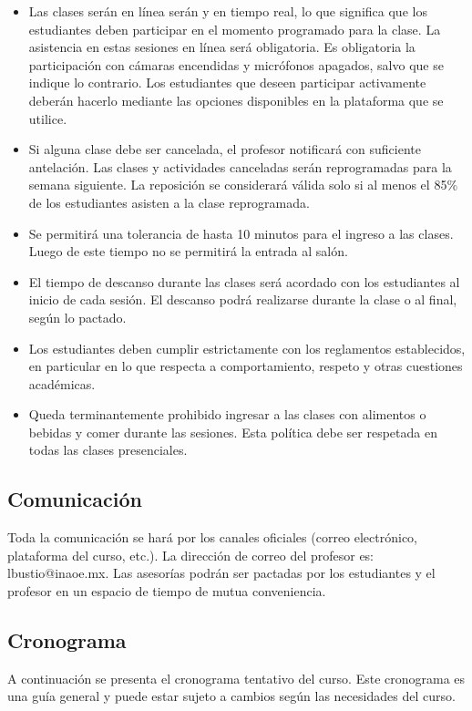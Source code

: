 \documentclass[
  coursetitle={Cómputo Nube y Tecnologías Emergentes},
  coursehours={96},
  coursedate={Verano 2026},
  doctype={Guía del curso},
  otherlangs={english,french},
  authorname={Lázaro},
  authorsurname={Bustio-Martínez},
  authortitle={PhD},
  role={Profesor Investigador},
  email={lbustio@inaoe.mx},
  phone={5559504000},
  ext={7459},
  institution={Instituto Nacional de Astrofísica, Óptica y Electrónica (INAOE)},
  department={Maestría en Ciencias en Tecnologías de Seguridad},
  address={Luis Enrique Erro 1, Sta. Ma. Tonantzintla, San Andrés Cholula, CP 72840, Puebla, México},
  margin={0.5in}
]{lbustio_lecture_notes}
\begin{document}
\begin{itemize}
  \item Las clases serán en línea serán y en tiempo real, lo que significa que los estudiantes deben participar en el momento programado para la clase. La asistencia en estas sesiones en línea será obligatoria. Es obligatoria la participación con cámaras encendidas y micrófonos apagados, salvo que se indique lo contrario. Los estudiantes que deseen participar activamente deberán hacerlo mediante las opciones disponibles en la plataforma que se utilice.
  \item Si alguna clase debe ser cancelada, el profesor notificará con suficiente antelación. Las clases y actividades canceladas serán reprogramadas para la semana siguiente. La reposición se considerará válida solo si al menos el 85\% de los estudiantes asisten a la clase reprogramada.
  \item Se permitirá una tolerancia de hasta 10 minutos para el ingreso a las clases. Luego de este tiempo no se permitirá la entrada al salón.
  \item El tiempo de descanso durante las clases será acordado con los estudiantes al inicio de cada sesión. El descanso podrá realizarse durante la clase o al final, según lo pactado.
  \item Los estudiantes deben cumplir estrictamente con los reglamentos establecidos, en particular en lo que respecta a comportamiento, respeto y otras cuestiones académicas.
  \item Queda terminantemente prohibido ingresar a las clases con alimentos o bebidas y comer durante las sesiones. Esta política debe ser respetada en todas las clases presenciales.

\end{itemize}

\subsection{Comunicación}
\label{sec:comuinicacion}
Toda la comunicación se hará por los canales oficiales (correo electrónico, plataforma del curso, etc.). La dirección de correo del profesor es: lbustio@inaoe.mx. Las asesorías podrán ser pactadas por los estudiantes y el profesor en un espacio de tiempo de mutua conveniencia.


\subsection{Cronograma}
\label{sec:cronograma}

A continuación se presenta el cronograma tentativo del curso. Este cronograma es una guía general y puede estar sujeto a cambios según las necesidades del curso.
\end{document}
